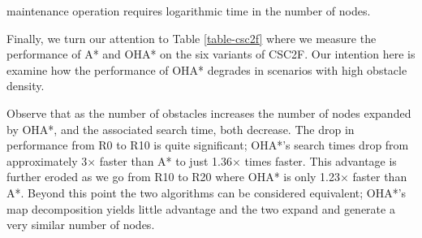 maintenance operation requires logarithmic time in the number of nodes.
\par
Finally, we turn our attention to Table \ref{table-csc2f} where we measure the 
performance of A* and OHA* on the six variants of CSC2F.
Our intention here is examine how the performance of OHA* degrades in scenarios with
high obstacle density.

Observe that as the number of obstacles increases the number of nodes expanded by OHA*, and the
associated search time, both decrease. 
The drop in performance from R0 to R10 is quite significant; OHA*'s search times drop
from approximately 3$\times$ faster than A* to just 1.36$\times$ times faster.
This advantage is further eroded as we go from R10 to R20 where OHA* is only 
1.23$\times$ faster than A*.
Beyond this point the two algorithms can be considered equivalent;
OHA*'s map decomposition yields little advantage and the two expand and generate 
a very similar number of nodes.
